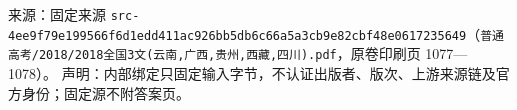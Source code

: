 
\begin{gktip}
来源：固定来源 \texttt{src-4ee9f79e199566f6d1edd411ac926bb5db6c66a5a3cb9e82cbf48e0617235649}（\texttt{普通高考/2018/2018全国3文(云南,广西,贵州,西藏,四川).pdf}，原卷印刷页 1077—1078）。
声明：内部绑定只固定输入字节，不认证出版者、版次、上游来源链及官方身份；固定源不附答案页。
\end{gktip}

\par\medskip


